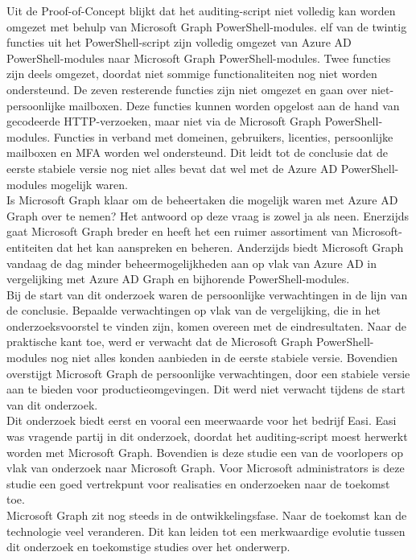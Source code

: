 Uit de Proof-of-Concept blijkt dat het auditing-script niet volledig kan worden omgezet met behulp van Microsoft Graph PowerShell-modules. elf van de twintig functies uit het PowerShell-script zijn volledig omgezet van Azure \Ac{AD} PowerShell-modules naar Microsoft Graph PowerShell-modules. Twee functies zijn deels omgezet, doordat niet sommige functionaliteiten nog niet worden ondersteund. De zeven resterende functies zijn niet omgezet en gaan over niet-persoonlijke mailboxen. Deze functies kunnen worden opgelost aan de hand van gecodeerde \ac{HTTP}-verzoeken, maar niet via de Microsoft Graph PowerShell-modules. Functies in verband met domeinen, gebruikers, licenties, persoonlijke mailboxen en \Ac{MFA} worden wel ondersteund. Dit leidt tot de conclusie dat de eerste stabiele versie nog niet alles bevat dat wel met de Azure \Ac{AD} PowerShell-modules mogelijk waren. \\ 

Is Microsoft Graph klaar om de beheertaken die mogelijk waren met Azure \Ac{AD} Graph over te nemen? Het antwoord op deze vraag is zowel ja als neen. Enerzijds gaat Microsoft Graph breder en heeft het een ruimer assortiment van Microsoft-entiteiten dat het kan aanspreken en beheren. Anderzijds biedt Microsoft Graph vandaag de dag minder beheermogelijkheden aan op vlak van Azure \Ac{AD} in vergelijking met Azure \Ac{AD} Graph en bijhorende PowerShell-modules. \\

Bij de start van dit onderzoek waren de persoonlijke verwachtingen in de lijn van de conclusie. Bepaalde verwachtingen op vlak van de vergelijking, die in het onderzoeksvoorstel te vinden zijn, komen overeen met de eindresultaten. Naar de praktische kant toe, werd er verwacht dat de Microsoft Graph PowerShell-modules nog niet alles konden aanbieden in de eerste stabiele versie. Bovendien overstijgt Microsoft Graph de persoonlijke verwachtingen, door een stabiele versie aan te bieden voor productieomgevingen. Dit werd niet verwacht tijdens de start van dit onderzoek. \\

Dit onderzoek biedt eerst en vooral een meerwaarde voor het bedrijf Easi. Easi was vragende partij in dit onderzoek, doordat het auditing-script moest herwerkt worden met Microsoft Graph. Bovendien is deze studie een van de voorlopers op vlak van onderzoek naar Microsoft Graph. Voor Microsoft administrators is deze studie een goed vertrekpunt voor realisaties en onderzoeken naar de toekomst toe. \\

Microsoft Graph zit nog steeds in de ontwikkelingsfase. Naar de toekomst kan de technologie veel veranderen. Dit kan leiden tot een merkwaardige evolutie tussen dit onderzoek en toekomstige studies over het onderwerp. 
 

